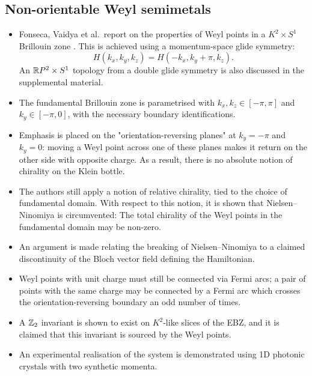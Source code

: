 \subsection{Non-orientable Weyl semimetals}

{\color{blue}
\begin{itemize}
	\item Fonseca, Vaidya et al.\ report on the properties of Weyl points in a $K^2\times S^1$ Brillouin zone \cite{Fonseca-Vaidya_nonorientable}. This is achieved using a momentum-space glide symmetry:
	\begin{equation}\label{eq:3D_glide}
		H(k_x, k_y, k_z) = H(-k_x, k_y + \pi, k_z).
	\end{equation}
	An $\mathbb{R} P^2\times S^1$ topology from a double glide symmetry is also discussed in the supplemental material.
	
	\item The fundamental Brillouin zone is parametrised with $k_x,k_z\in[-\pi,\pi]$ and $k_y\in[-\pi,0]$, with the necessary boundary identifications.
	
	\item Emphasis is placed on the "orientation-reversing planes" at $k_y = -\pi$ and $k_y = 0$: moving a Weyl point across one of these planes makes it return on the other side with opposite charge. As a result, there is no absolute notion of chirality on the Klein bottle.
	
	\item The authors still apply a notion of relative chirality, tied to the choice of fundamental domain. With respect to this notion, it is shown that Nielsen--Ninomiya is circumvented: The total chirality of the Weyl points in the fundamental domain may be non-zero.
	
	\item An argument is made relating the breaking of Nielsen--Ninomiya to a claimed discontinuity of the Bloch vector field defining the Hamiltonian.
	
	\item Weyl points with unit charge must still be connected via Fermi arcs; a pair of points with the same charge may be connected by a Fermi arc which crosses the orientation-reversing boundary an odd number of times.
	
	\item A $\mathbb{Z}_2$ invariant is shown to exist on $K^2$-like slices of the EBZ, and it is claimed that this invariant is sourced by the Weyl points.
	
	\item An experimental realisation of the system is demonstrated using 1D photonic crystals with two synthetic momenta.
\end{itemize}
}


